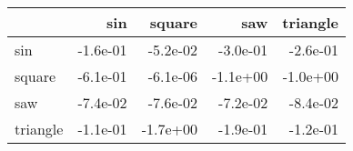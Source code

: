 \begin{tabular}{lrrrr}
\toprule
{} &      sin &   square &      saw &  triangle \\
\midrule
sin      & -1.6e-01 & -5.2e-02 & -3.0e-01 &  -2.6e-01 \\
square   & -6.1e-01 & -6.1e-06 & -1.1e+00 &  -1.0e+00 \\
saw      & -7.4e-02 & -7.6e-02 & -7.2e-02 &  -8.4e-02 \\
triangle & -1.1e-01 & -1.7e+00 & -1.9e-01 &  -1.2e-01 \\
\bottomrule
\end{tabular}
